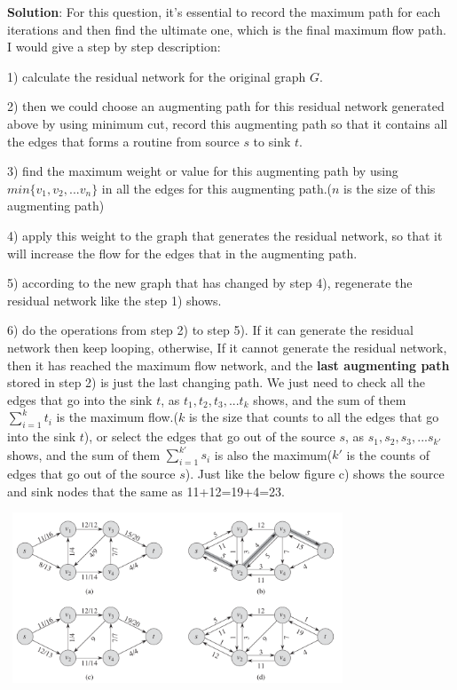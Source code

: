 \documentclass{article}
\begin{document}
\textbf{Solution}: For this question, it's essential to record the maximum path for each iterations and then find the
ultimate one, which is the final maximum flow path. I would give a step by step description:

1) calculate the residual network for the original graph $G$.

2) then we could choose an augmenting path for this residual network generated above by using minimum cut, record this augmenting path so that it contains all the edges that forms a routine from source $s$ to sink $t$.

3) find the maximum weight or value for this augmenting path by using $min\{v_{1}, v_{2}, ... v_{n}\}$ in all the edges
for this augmenting path.($n$ is the size of this augmenting path)

4) apply this weight to the graph that generates the residual network, so that it will increase the flow for the edges
that in the augmenting path.

5) according to the new graph that has changed by step 4), regenerate the residual network like the step 1) shows.

6) do the operations from step 2) to step 5). If it can generate the residual network then keep looping, otherwise, If it cannot generate the residual network, then it has reached the maximum flow network, and the \textbf{last augmenting path} stored in step 2) is just the last changing path. We just need to check all the edges that go into the sink $t$, as ${t_{1}, t_{2}, t_{3}, ... t_{k}}$ shows, and the sum of them $\sum_{i=1}^k{t_i}$ is the maximum flow.($k$ is the size that counts to all the edges that go into the sink $t$), or select the edges that go out of the source $s$, as ${s_{1},s_{2}, s_{3}, ... s_{k\prime}}$ shows, and the sum of them $\sum_{i=1}^{k\prime}{s_i}$ is also the maximum(${k\prime}$ is the counts of edges that go out of the source $s$). Just like the below figure c) shows the source and sink nodes that the same as 11+12=19+4=23.

\begin{center} %
\includegraphics[width=4.00in,height=2.00in]{hw5_2.png}
\end{center}
\end{document}
